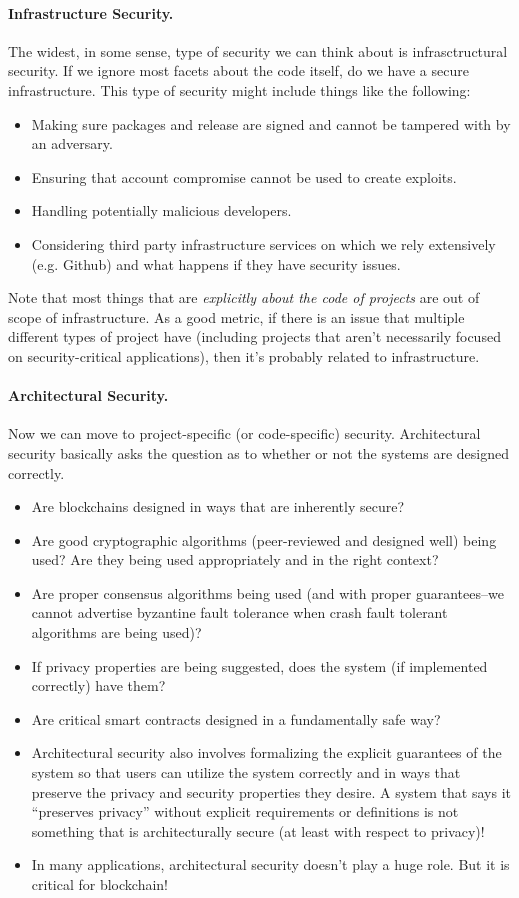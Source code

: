 \paragraph{Infrastructure Security.}  The widest, in some sense, type of security we can think about is infrasctructural security.  If we ignore most facets about the code itself, do we have a secure infrastructure.  This type of security might include things like the following:
\begin{itemize}
\item Making sure packages and release are signed and cannot be tampered with by an adversary.
\item Ensuring that account compromise cannot be used to create exploits.
\item Handling potentially malicious developers.
\item Considering third party infrastructure services on which we rely extensively (e.g. Github) and what happens if they have security issues.
\end{itemize}
Note that most things that are \emph{explicitly about the code of projects} are out of scope of infrastructure.  As a good metric, if there is an issue that multiple different types of project have (including projects that aren't necessarily focused on security-critical applications), then it's probably related to infrastructure.

\paragraph{Architectural Security.}  Now we can move to project-specific (or code-specific) security.  Architectural security basically asks the question as to whether or not the systems are designed correctly.
\begin{itemize}
\item Are blockchains designed in ways that are inherently secure?
\item Are good cryptographic algorithms (peer-reviewed and designed well) being used?  Are they being used appropriately and in the right context?
\item Are proper consensus algorithms being used (and with proper guarantees--we cannot advertise byzantine fault tolerance when crash fault tolerant algorithms are being used)?
\item If privacy properties are being suggested, does the system (if implemented correctly) have them?
\item Are critical smart contracts designed in a fundamentally safe way?
\item Architectural security also involves formalizing the explicit guarantees of the system so that users can utilize the system correctly and in ways that preserve the privacy and security properties they desire.  A system that says it ``preserves privacy'' without explicit requirements or definitions is not something that is architecturally secure (at least with respect to privacy)!
\item In many applications, architectural security doesn't play a huge role.  But it is critical for blockchain!
\end{itemize}

